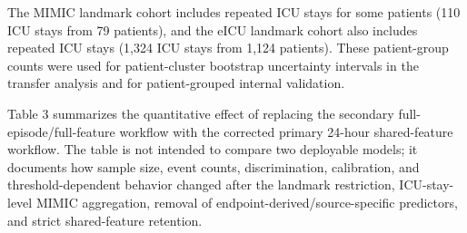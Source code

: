 \documentclass[utf8]{FrontiersinHarvard} %
\begin{document}
The MIMIC landmark cohort includes repeated ICU stays for some patients (110 ICU stays from 79 patients), and the eICU landmark cohort also includes repeated ICU stays (1,324 ICU stays from 1,124 patients). These patient-group counts were used for patient-cluster bootstrap uncertainty intervals in the transfer analysis and for patient-grouped internal validation.

Table 3 summarizes the quantitative effect of replacing the secondary full-episode/full-feature workflow with the corrected primary 24-hour shared-feature workflow. The table is not intended to compare two deployable models; it documents how sample size, event counts, discrimination, calibration, and threshold-dependent behavior changed after the landmark restriction, ICU-stay-level MIMIC aggregation, removal of endpoint-derived/source-specific predictors, and strict shared-feature retention.
\end{document}
